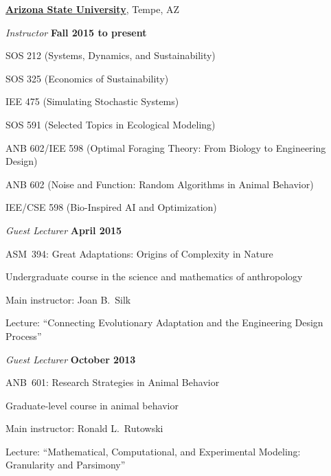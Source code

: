\documentclass[10pt]{article}           %
\newcommand{\entry}{\item[{}]}
\begin{document}
\href{http://www.asu.edu/}{\textbf{Arizona State University}},
Tempe, AZ
\begin{cvlist}[loose]

    \entry \textit{Instructor} \hfill \textbf{Fall 2015 to present}
    \begin{cvlist}
        \item SOS 212 (Systems, Dynamics, and Sustainability)
        \item SOS 325 (Economics of Sustainability)
        \item IEE 475 (Simulating Stochastic Systems)
        \item SOS 591 (Selected Topics in Ecological Modeling)
        \item ANB 602/IEE 598
            (Optimal Foraging Theory: From Biology to Engineering Design)
        \item ANB 602
            (Noise and Function: Random Algorithms in Animal Behavior)
        \item IEE/CSE 598
            (Bio-Inspired AI and Optimization)
    \end{cvlist}

    \entry \textit{Guest Lecturer} \hfill \textbf{April 2015}
    \begin{cvlist}
        \item ASM~394: Great Adaptations: Origins of Complexity in Nature
        \begin{cvlist}
            \item Undergraduate course in the science and mathematics of anthropology
            \item Main instructor: Joan B.~Silk
            \item Lecture: ``Connecting Evolutionary Adaptation and the Engineering Design Process''
        \end{cvlist}
    \end{cvlist}

    \entry \textit{Guest Lecturer} \hfill \textbf{October 2013}
    \begin{cvlist}
        \item ANB~601: Research Strategies in Animal Behavior
        \begin{cvlist}
            \item Graduate-level course in animal behavior
            \item Main instructor: Ronald L.~Rutowski
            \item Lecture: ``Mathematical, Computational, and Experimental Modeling: Granularity and Parsimony''
        \end{cvlist}
    \end{cvlist}

\end{cvlist}
\end{document}

